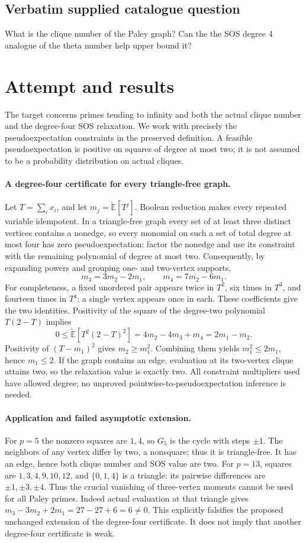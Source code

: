 \documentclass[11pt]{article}
\begin{document}
\subsection{Verbatim supplied catalogue question}
What is the clique number of the Paley graph? Can the the SOS degree 4 analogue of the theta number help upper bound it?

\section{Attempt and results}
The target concerns primes tending to infinity and both the actual clique
number and the degree-four SOS relaxation. We work with precisely the
pseudoexpectation constraints in the preserved definition. A feasible
pseudoexpectation is positive on squares of degree at most two; it is not
assumed to be a probability distribution on actual cliques.

\paragraph{A degree-four certificate for every triangle-free graph.}
Let $T=\sum_i x_i$, and let $m_j=\widetilde{\mathbb E}[T^j]$.
Boolean reduction makes every repeated variable idempotent. In a
triangle-free graph every set of at least three distinct vertices contains
a nonedge, so every monomial on such a set of total degree at most four
has zero pseudoexpectation: factor the nonedge and use its constraint
with the remaining polynomial of degree at most two. Consequently,
by expanding powers and grouping one- and two-vertex supports,
\[
m_3=3m_2-2m_1,\qquad m_4=7m_2-6m_1.
\]
For completeness, a fixed unordered pair appears twice in $T^2$, six
times in $T^3$, and fourteen times in $T^4$; a single vertex appears once
in each. These coefficients give the two identities.
Positivity of the square of the degree-two polynomial $T(2-T)$ implies
\[
0\le\widetilde{\mathbb E}[T^2(2-T)^2]
=4m_2-4m_3+m_4=2m_1-m_2.
\]
Positivity of $(T-m_1)^2$ gives $m_2\ge m_1^2$. Combining them yields
$m_1^2\le2m_1$, hence $m_1\le2$. If the graph contains an edge, evaluation
at its two-vertex clique attains two, so the relaxation value is exactly two.
All constraint multipliers used have allowed degree; no unproved
pointwise-to-pseudoexpectation inference is needed.

\paragraph{Application and failed asymptotic extension.}
For $p=5$ the nonzero squares are $1,4$, so $G_5$ is the cycle with steps
$\pm1$. The neighbors of any vertex differ by two, a nonsquare; thus it is
triangle-free. It has an edge, hence both clique number and SOS value are two.
For $p=13$, squares are $1,3,4,9,10,12$, and $\{0,1,4\}$ is a triangle:
its pairwise differences are $\pm1,\pm3,\pm4$.
Thus the crucial vanishing of three-vertex moments cannot be used for all
Paley primes. Indeed actual evaluation at that triangle gives
$m_3-3m_2+2m_1=27-27+6=6\ne0$.
This explicitly falsifies the proposed unchanged extension of the degree-four
certificate. It does not imply that another degree-four certificate is weak.
\end{document}
